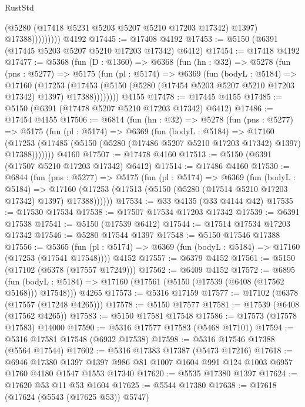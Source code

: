 \begin{lexlean}{RustStd}
\begin{coremodule}
                      (@5280 (@17418 @5231 @5203 @5207 @5210 @17203 @17342) @1397)
                      @17388)))))))))
    @4192
@17445 := @17408 @4192
@17453 := @5150 (@6391 (@17445 @5203 @5207 @5210 @17203 @17342) @6412)
@17454 := @17418 @4192
@17477 := @5368
    (fun (D : @1360) =>
    @6368
      (fun (hn : @32) =>
      @5278
        (fun (pns : @5277) =>
        @5175
          (fun (pl : @5174) =>
          @6369
            (fun (bodyL : @5184) =>
            @17160
              (@17253
                (@17453 (@5150 (@5280 (@17454 @5203 @5207 @5210 @17203 @17342) @1397) @17388))))))))
    @4155
@17478 := @17445 @4155
@17485 := @5150 (@6391 (@17478 @5207 @5210 @17203 @17342) @6412)
@17486 := @17454 @4155
@17506 := @6814
    (fun (hn : @32) =>
    @5278
      (fun (pns : @5277) =>
      @5175
        (fun (pl : @5174) =>
        @6369
          (fun (bodyL : @5184) =>
          @17160
            (@17253 (@17485 (@5150 (@5280 (@17486 @5207 @5210 @17203 @17342) @1397) @17388)))))))
    @4160
@17507 := @17478 @4160
@17513 := @5150 (@6391 (@17507 @5210 @17203 @17342) @6412)
@17514 := @17486 @4160
@17530 := @6844
    (fun (pns : @5277) =>
    @5175
      (fun (pl : @5174) =>
      @6369
        (fun (bodyL : @5184) =>
        @17160 (@17253 (@17513 (@5150 (@5280 (@17514 @5210 @17203 @17342) @1397) @17388))))))
@17534 := @33 @4135 (@33 @4144 @42)
@17535 := @17530 @17534
@17538 := @17507 @17534 @17203 @17342
@17539 := @6391 @17538
@17541 := @5150 (@17539 @6412)
@17544 := @17514 @17534 @17203 @17342
@17546 := @5280 @17544 @1397
@17548 := @5150 @17546 @17388
@17556 := @5365
    (fun (pl : @5174) => @6369 (fun (bodyL : @5184) => @17160 (@17253 (@17541 @17548))))
    @4152
@17557 := @6379 @4152
@17561 := @5150 (@17102 (@6378 (@17557 @17249)))
@17562 := @6409 @4152
@17572 := @6895
    (fun (bodyL : @5184) => @17160 (@17561 (@5150 (@17539 (@6408 (@17562 @5168))) @17548)))
    @4265
@17573 := @5316 @17159
@17577 := @17102 (@6378 (@17557 (@17248 @4265)))
@17578 := @5150 @17577
@17581 := @17539 (@6408 (@17562 @4265))
@17583 := @5150 @17581 @17548
@17586 := @17573 (@17578 @17583) @14000
@17590 := @5316 @17577 @17583 (@5468 @17101)
@17594 := @5316 @17581 @17548 (@6932 @17538)
@17598 := @5316 @17546 @17388 (@5564 @17544)
@17602 := @5316 @17383 @17387 (@5473 @17216)
@17618 := @6946
    @17380
    @1397
    @1397
    @986
    @81
    @1007
    @1604
    @991
    @124
    @1003
    @6957
    @1760
    @4180
    @1547
    @1553
    @17340
@17620 := @5535 @17380 @1397
@17624 := @17620 @53 @11 @53 @1604
@17625 := @5544 @17380
@17638 := @17618
    (@17624 (@5543 (@17625 @53)) @5747)

\end{coremodule}
\end{lexlean}
